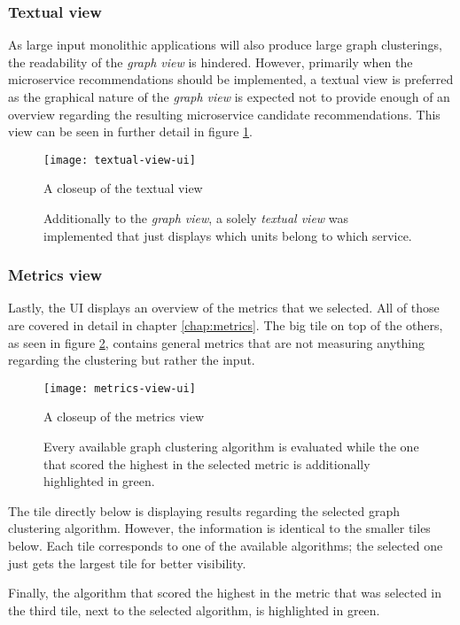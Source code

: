 \documentclass[12pt,a4paper]{report}
\begin{document}
\subsubsection{Textual view}
As large input monolithic applications will also
produce large graph clusterings, the readability of the \textit{graph view} is
hindered. However, primarily when the microservice recommendations should be
implemented, a textual view is preferred as the graphical nature of the \textit{
graph view} is expected not to provide enough of an overview regarding the
resulting microservice candidate recommendations. This view can be seen in
further detail in figure \ref{fig:textual-view-ui}.

\begin{figure}[htbp]
\centering
\texttt{[image: textual-view-ui]}
\caption{A closeup of the textual view}
\caption*{\centering
  Additionally to the \textit{graph view}, a solely \textit{textual view}
  was implemented that just displays which units belong to which service.
}
\label{fig:textual-view-ui}
\end{figure}


\subsubsection{Metrics view}
Lastly, the UI displays an overview of the metrics
that we selected. All of those are covered in detail in chapter
\ref{chap:metrics}. The big tile on top of the others, as seen in figure
\ref{fig:metrics-view-ui}, contains general metrics that are not measuring
anything regarding the clustering but rather the input.

\begin{figure}[htbp]
\centering
\texttt{[image: metrics-view-ui]}
\caption{A closeup of the metrics view}
\caption*{\centering
  Every available graph clustering algorithm is evaluated while the one that
  scored the highest in the selected metric is additionally highlighted in green.
}
\label{fig:metrics-view-ui}
\end{figure}

The tile directly below is displaying results regarding the selected graph
clustering algorithm. However, the information is identical to the smaller
tiles below. Each tile corresponds to one of the available algorithms; the
selected one just gets the largest tile for better visibility.

Finally, the algorithm that scored the highest in the metric that was selected
in the third tile, next to the selected algorithm, is highlighted in green.
\end{document}
